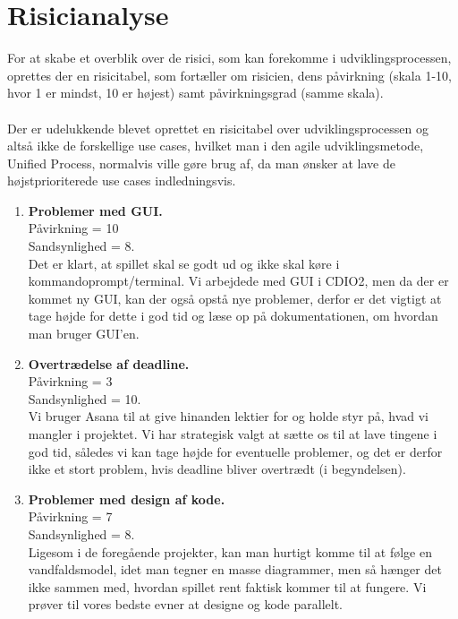\newpage
\section{Risicianalyse}
For at skabe et overblik over de risici, som kan forekomme i udviklingsprocessen, oprettes der en risicitabel, som fortæller om risicien, dens påvirkning (skala 1-10, hvor 1 er mindst, 10 er højest) samt påvirkningsgrad (samme skala). \\ \\
Der er udelukkende blevet oprettet en risicitabel over udviklingsprocessen og altså ikke de forskellige use cases, hvilket man i den agile udviklingsmetode, Unified Process, normalvis ville gøre brug af, da man ønsker at lave de højstprioriterede use cases indledningsvis.

\begin{enumerate}
    \item \textbf{Problemer med GUI.} \\
    Påvirkning = 10\\ Sandsynlighed = 8.\\
    Det er klart, at spillet skal se godt ud og ikke skal køre i kommandoprompt/terminal.
    Vi arbejdede med GUI i CDIO2, men da der er kommet ny GUI, kan der også opstå nye problemer, derfor er det vigtigt at tage højde for dette i god tid og læse op på dokumentationen, om hvordan man bruger GUI'en.
    \item \textbf{Overtrædelse af deadline.} \\
    Påvirkning = 3\\ Sandsynlighed = 10.\\
    Vi bruger Asana til at give hinanden lektier for og holde styr på, hvad vi mangler i projektet.
    Vi har strategisk valgt at sætte os til at lave tingene i god tid, således vi kan tage højde for eventuelle problemer, og det er derfor ikke et stort problem, hvis deadline bliver overtrædt (i begyndelsen).
    \item \textbf{Problemer med design af kode.} \\
    Påvirkning = 7\\ Sandsynlighed = 8.\\
    Ligesom i de foregående projekter, kan man hurtigt komme til at følge en vandfaldsmodel, idet man tegner en masse diagrammer, men så hænger det ikke sammen med, hvordan spillet rent faktisk kommer til at fungere.
    Vi prøver til vores bedste evner at designe og kode parallelt.
    
\end{enumerate}

